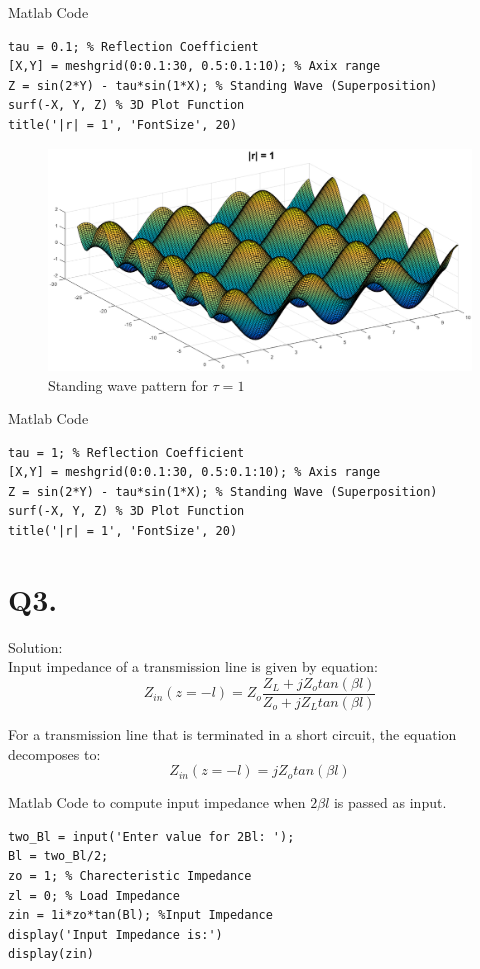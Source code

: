 \newpage
Matlab Code
\begin{lstlisting}
tau = 0.1; % Reflection Coefficient
[X,Y] = meshgrid(0:0.1:30, 0.5:0.1:10); % Axix range
Z = sin(2*Y) - tau*sin(1*X); % Standing Wave (Superposition)
surf(-X, Y, Z) % 3D Plot Function 
title('|r| = 1', 'FontSize', 20)
\end{lstlisting}


\begin{figure}[!ht]
	\centering
	\includegraphics[scale=0.45]{q2b.png}
	\caption{\label{q1}  Standing wave pattern for $\tau = 1$}
\end{figure}

Matlab Code
\begin{lstlisting}
tau = 1; % Reflection Coefficient
[X,Y] = meshgrid(0:0.1:30, 0.5:0.1:10); % Axis range
Z = sin(2*Y) - tau*sin(1*X); % Standing Wave (Superposition)
surf(-X, Y, Z) % 3D Plot Function 
title('|r| = 1', 'FontSize', 20)
\end{lstlisting}

   
\section{Q3.} %
Solution:\\

Input impedance of a transmission line is given by equation:
$$Z_{in}(z = -l) = Z_o\frac{Z_L + j Z_o tan(\beta l)}{Z_o + j Z_L tan(\beta l)}$$

For a transmission line that is terminated in a short circuit, the equation decomposes to:
$$ Z_{in}(z = -l) = j Z_o tan(\beta l)$$

Matlab Code to compute input impedance when $2 \beta l$ is passed as input.
\begin{lstlisting}
two_Bl = input('Enter value for 2Bl: ');
Bl = two_Bl/2;
zo = 1; % Charecteristic Impedance
zl = 0; % Load Impedance
zin = 1i*zo*tan(Bl); %Input Impedance
display('Input Impedance is:')
display(zin)
\end{lstlisting}

